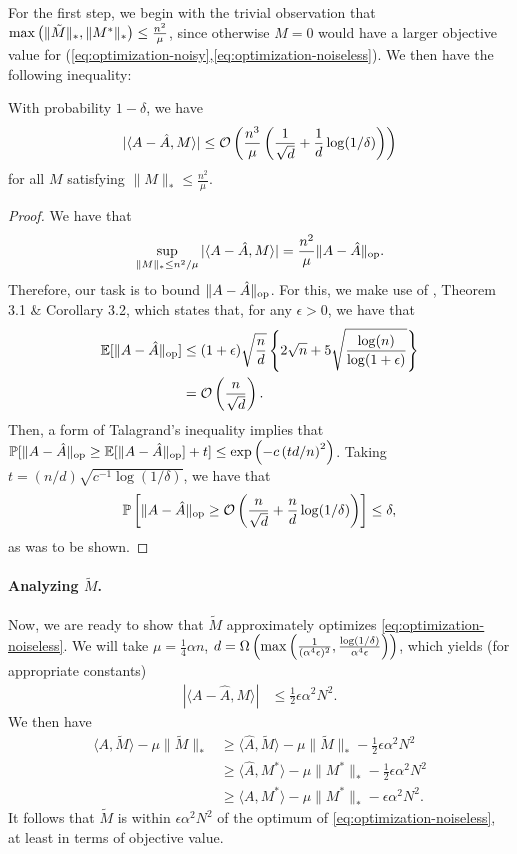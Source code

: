 \documentclass[11pt]{article}
\newcommand{\M}{\tilde{M}}
\newcommand{\A}{\hat{A}}
\newcommand{\oo}{\mathcal{O}}
\begin{document}
For the first step, we begin with the trivial observation that 
$\max\p{\|\M\|_*, \|M^*\|_*} \leq \frac{n^2}{\mu}$, since otherwise $M = 0$ 
would have a larger objective value for (\ref{eq:optimization-noisy},\ref{eq:optimization-noiseless}). 
We then have the following inequality:
\begin{lemma}
With probability $1-\delta$, we have
\[ |\langle A-\A, M \rangle| \leq \oo\p{\frac{n^3}{\mu}\p{\frac{1}{\sqrt{d}} + \frac{1}{d}\log(1/\delta)}} \]
for all $M$ satisfying $\|M\|_* \leq \frac{n^2}{\mu}$.
\end{lemma}
\begin{proof}
We have that 
\[ \sup_{\|M\|_* \leq n^2/\mu} |\langle A-\A, M \rangle| = \frac{n^2}{\mu}\|A-\A\|_{\op}. \]
Therefore, our task is to bound $\|A-\A\|_{\op}$. For this, we make use of \citet{rmt}, 
Theorem 3.1 \& Corollary 3.2, which states that, for any $\epsilon > 0$, we have that
\begin{align}
\bE[\|A-\A\|_{\op}] &\leq (1+\epsilon)\sqrt{\frac{n}{d}}\left\{2\sqrt{n} + 5\sqrt{\frac{\log(n)}{\log(1+\epsilon)}}\right\} \\
 &= \oo\p{\frac{n}{\sqrt{d}}}.
\end{align}
Then, a form of Talagrand's inequality implies that
$\bP[\|A-\A\|_{\op} \geq \bE[\|A-\A\|_{\op}] + t] \leq \exp\p{-c\p{td/n}^2}$. 
Taking $t = (n/d)\sqrt{c^{-1}\log(1/\delta)}$, we have that 
\[ \bP\left[\|A-\A\|_{\op} \geq \oo\p{\frac{n}{\sqrt{d}} + \frac{n}{d}\log(1/\delta)}\right] \leq \delta, \]
as was to be shown.
\end{proof}
\paragraph{Analyzing $\M$.} Now, we are ready to show that 
$\M$ approximately optimizes \eqref{eq:optimization-noiseless}. 
We will take $\mu = \frac{1}{4}\alpha n$, 
$d = \Omega\left(\max\left(\frac{1}{(\alpha^4\epsilon)^2}, \frac{\log(1/\delta)}{\alpha^4\epsilon}\right)\right)$, which yields (for appropriate constants)
\begin{align}
|\langle A-\A, M \rangle| &\leq \frac{1}{2}\epsilon \alpha^2 N^2.
\end{align}
We then have
\begin{align}
\langle A, \M \rangle - \mu \|\M\|_* &\geq \langle \A, \M \rangle - \mu \|\M\|_* - \frac{1}{2}\epsilon \alpha^2 N^2 \\
 &\geq \langle \A, M^* \rangle - \mu \|M^*\|_* - \frac{1}{2} \epsilon \alpha^2 N^2 \\
 &\geq \langle A, M^* \rangle - \mu \|M^*\|_* - \epsilon \alpha^2 N^2.
\end{align}
It follows that $\M$ is within $\epsilon \alpha^2N^2$ of the optimum of \eqref{eq:optimization-noiseless}, 
at least in terms of objective value.
\end{document}
